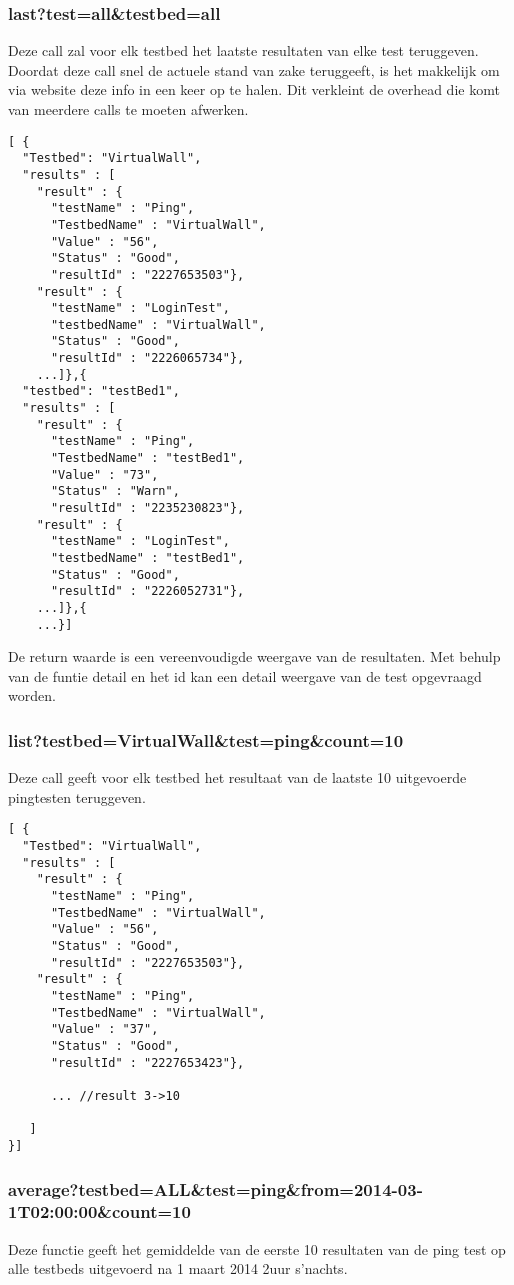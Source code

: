 \documentclass[11pt]{article}
\begin{document}
\subsubsection{last?test=all\&testbed=all}
Deze call zal voor elk testbed het laatste resultaten van elke test teruggeven. Doordat deze call snel de actuele stand van zake teruggeeft, is het makkelijk om via website deze info in een keer op te halen. Dit verkleint de overhead die komt van meerdere calls te moeten afwerken.
\begin{verbatim}
[ { 
  "Testbed": "VirtualWall",
  "results" : [
    "result" : {
      "testName" : "Ping",
      "TestbedName" : "VirtualWall",
      "Value" : "56",
      "Status" : "Good",
      "resultId" : "2227653503"},
    "result" : {
      "testName" : "LoginTest",
      "testbedName" : "VirtualWall",
      "Status" : "Good",
      "resultId" : "2226065734"},
    ...]},{ 
  "testbed": "testBed1",
  "results" : [
    "result" : {
      "testName" : "Ping",
      "TestbedName" : "testBed1",
      "Value" : "73",
      "Status" : "Warn",
      "resultId" : "2235230823"},
    "result" : {
      "testName" : "LoginTest",
      "testbedName" : "testBed1",
      "Status" : "Good",
      "resultId" : "2226052731"},
    ...]},{
    ...}]
\end{verbatim}
De return waarde is een vereenvoudigde weergave van de resultaten. Met behulp van de funtie detail en het id kan een detail weergave van de test opgevraagd worden.

\clearpage
\subsubsection{list?testbed=VirtualWall\&test=ping\&count=10}
Deze call geeft voor elk testbed het resultaat van de laatste 10 uitgevoerde pingtesten teruggeven.
\begin{verbatim}
[ { 
  "Testbed": "VirtualWall",
  "results" : [
    "result" : {
      "testName" : "Ping",
      "TestbedName" : "VirtualWall",
      "Value" : "56",
      "Status" : "Good",
      "resultId" : "2227653503"},
    "result" : {
      "testName" : "Ping",
      "TestbedName" : "VirtualWall",
      "Value" : "37",
      "Status" : "Good",
      "resultId" : "2227653423"},
      
      ... //result 3->10
      
   ]
}]
\end{verbatim}

\subsubsection{average?testbed=ALL\&test=ping\&from=2014-03-1T02:00:00\&count=10}
Deze functie geeft het gemiddelde van de eerste 10 resultaten van de ping test op alle testbeds uitgevoerd na 1 maart 2014 2uur s'nachts.
\end{document}
